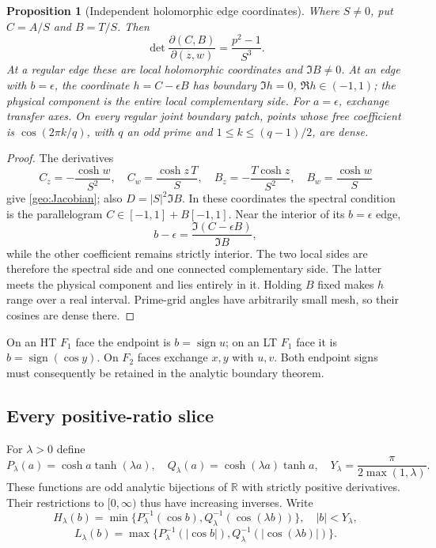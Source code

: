 \documentclass[11pt]{article}
\numberwithin{equation}{section}
\newtheorem{proposition}[theorem]{Proposition}
\theoremstyle{definition}
\begin{document}
\begin{proposition}[Independent holomorphic edge coordinates]
\label{geo:local-coordinates}
Where $S\ne0$, put $C=A/S$ and $B=T/S$.  Then
\begin{equation}\label{geo:Jacobian}
 \det\frac{\partial(C,B)}{\partial(z,w)}=\frac{p^2-1}{S^3}.
\end{equation}
At a regular edge these are local holomorphic coordinates and
$\Im B\ne0$.  At an edge with $b=\epsilon$, the coordinate
$h=C-\epsilon B$ has boundary $\Im h=0$, $\Re h\in(-1,1)$;
the physical component is the entire local complementary side.
For $a=\epsilon$, exchange transfer axes.
On every regular joint boundary patch, points whose free coefficient is
$\cos(2\pi k/q)$, with $q$ an odd prime and $1\le k\le(q-1)/2$,
are dense.
\end{proposition}
\begin{proof}
The derivatives
\[
 C_z=-\frac{\cosh w}{S^2},\quad C_w=\frac{\cosh z\,T}{S},\quad
 B_z=-\frac{T\cosh z}{S^2},\quad B_w=\frac{\cosh w}{S}
\]
give \eqref{geo:Jacobian}; also $D=|S|^2\Im B$.
In these coordinates the spectral condition is the parallelogram
$C\in[-1,1]+B[-1,1]$.  Near the interior of its $b=\epsilon$ edge,
\[
 b-\epsilon=\frac{\Im(C-\epsilon B)}{\Im B},
\]
while the other coefficient remains strictly interior.  The two local
sides are therefore the spectral side and one connected complementary
side.  The latter meets the physical component and lies entirely in it.
Holding $B$ fixed makes $h$ range over a real interval.  Prime-grid
angles have arbitrarily small mesh, so their cosines are dense there.
\end{proof}

On an HT $F_1$ face the endpoint is $b=\operatorname{sign}u$;
on an LT $F_1$ face it is $b=\operatorname{sign}(\cos y)$.
On $F_2$ faces exchange $x,y$ with $u,v$.  Both endpoint signs
must consequently be retained in the analytic boundary theorem.

\subsection{Every positive-ratio slice}
For $\lambda>0$ define
\[
 P_\lambda(a)=\cosh a\tanh(\lambda a),\quad
 Q_\lambda(a)=\cosh(\lambda a)\tanh a,\quad
 Y_\lambda=\frac{\pi}{2\max(1,\lambda)}.
\]
These functions are odd analytic bijections of $\mathbb R$ with
strictly positive derivatives.  Their restrictions to $[0,\infty)$
thus have increasing inverses.  Write
\[
 H_\lambda(b)=\min\{P_\lambda^{-1}(\cos b),Q_\lambda^{-1}(\cos(\lambda b))\},
 \quad |b|<Y_\lambda,
\]
\[
 L_\lambda(b)=\max\{P_\lambda^{-1}(|\cos b|),Q_\lambda^{-1}(|\cos(\lambda b)|)\}.
\]
\end{document}
